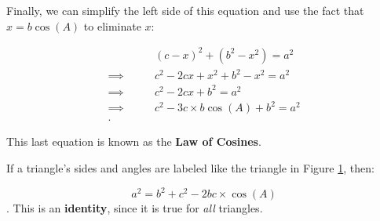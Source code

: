Finally, we can simplify the left side of this equation and use the fact that
$x = b\cos (A)$ to eliminate $x$:

\begin{align*}
  \qquad&(c - x)^{2} + (b^{2} - x^{2}) = a^{2} \\
  \implies\qquad&c^{2} - 2cx + x^{2} + b^{2} - x^{2} = a^{2} \\
  \implies\qquad&c^{2} - 2cx + b^{2} = a^{2} \\
  \implies\qquad&c^{2} - 3c \times b\cos (A) + b^{2} = a^{2} \\
.\end{align*}

This last equation is known as the \textbf{Law of Cosines}.

\begin{definition}
  \label{def:law_of_cosines}

  If a triangle's sides and angles are labeled like the triangle in Figure
  \ref{fig:law_of_cosines}, then:

	\begin{figure}[H]
		\centering


		\caption{}
		\label{fig:law_of_cosines}
	\end{figure}

  \[ a^{2} = b^{2} + c^{2} - 2bc \times \cos (A) \].
  This is an \textbf{identity}, since it is true for \textit{all} triangles.
\end{definition}

